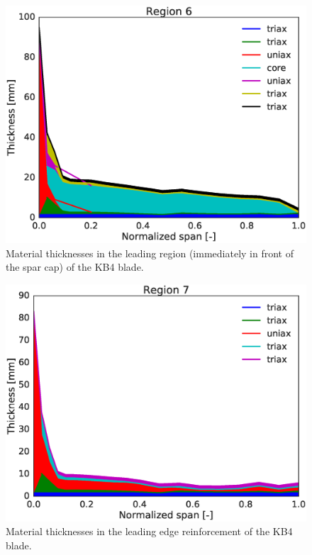 \begin{figure}[pth]
\begin{center}
	\includegraphics[width=.85\linewidth]{figures/KB4_laminate_layers_r06.eps}
\end{center}
\caption{Material thicknesses in the leading region (immediately in front of the spar cap) of the KB4 blade.}
\label{fig:KB4matstackr06}
\end{figure}

\begin{figure}[pth]
\begin{center}
	\includegraphics[width=.85\linewidth]{figures/KB4_laminate_layers_r07.eps}
\end{center}
\caption{Material thicknesses in the leading edge reinforcement of the KB4 blade.}
\label{fig:KB4matstackr07}
\end{figure}
